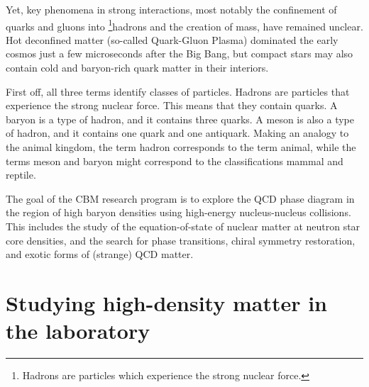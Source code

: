 Yet, key phenomena in strong interactions, most notably the confinement of quarks and gluons into \footnote{Hadrons are particles which experience the strong nuclear force.}{hadrons} and the creation of mass, have remained unclear. Hot deconfined matter (so-called Quark-Gluon Plasma) dominated the early cosmos just a few microseconds after the Big Bang, but compact stars may also contain cold and baryon-rich quark matter in their interiors. 


First off, all three terms identify classes of particles. Hadrons are particles that experience the strong nuclear force. This means that they contain quarks. A baryon is a type of hadron, and it contains three quarks. A meson is also a type of hadron, and it contains one quark and one antiquark. Making an analogy to the animal kingdom, the term hadron corresponds to the term animal, while the terms meson and baryon might correspond to the classifications mammal and reptile.
 


 The goal of the CBM research program is to explore the QCD phase diagram in the region of high baryon densities using high-energy nucleus-nucleus collisions. This includes the study of the equation-of-state of nuclear matter at neutron star core densities, and the search for phase transitions, chiral symmetry restoration, and exotic forms of (strange) QCD matter.


\section{Studying high-density matter in the laboratory}


